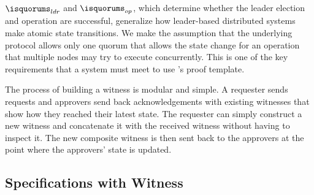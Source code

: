 $\isquorums_{ldr}$ and $\isquorums_{op}$, which determine whether the leader 
election and operation are successful, generalize how leader-based distributed 
systems make atomic state transitions. We make the assumption that the underlying
protocol allows only one quorum that allows the state change for an operation 
that multiple nodes may try to execute concurrently. This is one of the key
requirements that a system must meet to use \sysname{}'s proof template.

The process of building a witness is modular and simple. A requester sends
requests and approvers send back acknowledgements with existing witnesses that
show how they reached their latest state.
The requester can simply construct a new witness and concatenate it with the
received witness without having to inspect it.
The new composite witness is then sent back to the approvers at the point where
the approvers' state is updated.

\subsection{Specifications with Witness} 
\label{chapter:witnesspassing:subsec:specifications-with-witness}

